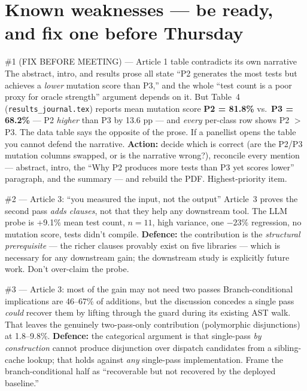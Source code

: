 \documentclass[11pt]{article}
\begin{document}
\section{Known weaknesses --- be ready, and fix one before Thursday}
\label{sec:weak}

\begin{redflagbox}{\#1 (FIX BEFORE MEETING) --- Article 1 table contradicts its own narrative}
The abstract, intro, and results prose all state ``P2 generates the most tests
but achieves a \emph{lower} mutation score than P3,'' and the whole ``test
count is a poor proxy for oracle strength'' argument depends on it. But
Table~4 (\texttt{results\_journal.tex}) reports mean mutation score
\textbf{P2 = 81.8\%} vs.\ \textbf{P3 = 68.2\%} --- P2 \emph{higher} than P3 by
13.6 pp --- and \emph{every} per-class row shows P2 $>$ P3. The data table
says the opposite of the prose. If a panellist opens the table you cannot
defend the narrative. \textbf{Action:} decide which is correct (are the P2/P3
mutation columns swapped, or is the narrative wrong?), reconcile every mention
--- abstract, intro, the ``Why P2 produces more tests than P3 yet scores
lower'' paragraph, and the summary --- and rebuild the PDF. Highest-priority
item.
\end{redflagbox}

\begin{redflagbox}{\#2 --- Article 3: ``you measured the input, not the output''}
Article~3 proves the second pass \emph{adds clauses}, not that they help any
downstream tool. The LLM probe is +9.1\% mean test count, $n=11$, high
variance, one $-23\%$ regression, no mutation score, tests didn't compile.
\textbf{Defence:} the contribution is the \emph{structural prerequisite} --- the
richer clauses provably exist on five libraries --- which is necessary for any
downstream gain; the downstream study is explicitly future work. Don't
over-claim the probe.
\end{redflagbox}

\begin{redflagbox}{\#3 --- Article 3: most of the gain may not need two passes}
Branch-conditional implications are 46--67\% of additions, but the discussion
concedes a single pass \emph{could} recover them by lifting through the guard
during its existing AST walk. That leaves the genuinely two-pass-only
contribution (polymorphic disjunctions) at 1.8--9.8\%. \textbf{Defence:} the
categorical argument is that single-pass \emph{by construction} cannot produce
disjunction over dispatch candidates from a sibling-cache lookup; that holds
against \emph{any} single-pass implementation. Frame the branch-conditional
half as ``recoverable but not recovered by the deployed baseline.''
\end{redflagbox}
\end{document}
